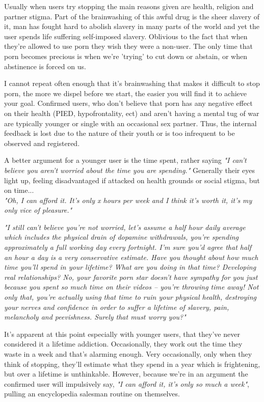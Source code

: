 \documentclass[easypeasy.tex]{subfiles}
\begin{document}
Usually when users try stopping the main reasons given are health, religion and partner stigma. Part of the brainwashing of this awful drug is the sheer slavery of it, man has fought hard to abolish slavery in many parts of the world and yet the user spends life suffering self-imposed slavery. Oblivious to the fact that when they're allowed to use porn they wish they were a non-user. The only time that porn becomes precious is when we're 'trying' to cut down or abstain, or when abstinence is forced on us.

I cannot repeat often enough that it's brainwashing that makes it difficult to stop porn, the more we dispel before we start, the easier you will find it to achieve your goal. Confirmed users, who don't believe that porn has any negative effect on their health (PIED, hypofrontality, ect) and aren't having a mental tug of war are typically younger or single with an occasional sex partner. Thus, the internal feedback is lost due to the nature of their youth or is too infrequent to be observed and registered.

A better argument for a younger user is the time spent, rather saying \textit{"I can't believe you aren't worried about the time you are spending."} Generally their eyes light up, feeling disadvantaged if attacked on health grounds or social stigma, but on time... \\
  \textit{"Oh, I can afford it. It's only x hours per week and I think it's worth it, it's my only vice of pleasure."}

\textit{"I still can't believe you're not worried, let's assume a half hour daily average which includes the physical drain of dopamine withdrawals, you're spending approximately a full working day every fortnight. I'm sure you'd agree that half an hour a day is a very conservative estimate. Have you thought about how much time you'll spend in your lifetime? What are you doing in that time? Developing real relationships? No, your favorite porn star doesn't have sympathy for you just because you spent so much time on their videos -- you're throwing time away! Not only that, you're actually using that time to ruin your physical health, destroying your nerves and confidence in order to suffer a lifetime of slavery, pain, melancholy and peevishness. Surely that must worry you?"}

It's apparent at this point especially with younger users, that they've never considered it a lifetime addiction. Occasionally, they work out the time they waste in a week and that's alarming enough. Very occasionally, only when they think of stopping, they'll estimate what they spend in a year which is frightening, but over a lifetime is unthinkable. However, because we're in an argument the confirmed user will impulsively say, \textit{"I can afford it, it's only so much a week"}, pulling an encyclopedia salesman routine on themselves.
\end{document}
